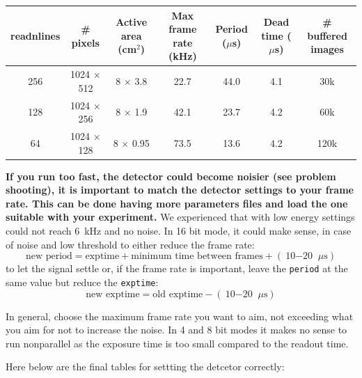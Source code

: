 \documentclass{article}
\begin{document}
{{{\begin{tabular}{|c|c|c|c|c|c|c|}
\hline
 readnlines & \# pixels & Active area (cm$^2$) & Max frame rate (kHz) & Period ($\mu$s) & Dead time ($\mu$s) & \# buffered images\\
\hline
256 &1024 $\times$ 512 & 8 $\times$ 3.8 & 22.7 & 44.0 &4.1 & 30k\\
\hline
128 &1024 $\times$ 256 & 8 $\times$ 1.9 & 42.1 & 23.7 &4.2 & 60k\\
\hline
64 & 1024 $\times$ 128 & 8 $\times$ 0.95 & 73.5 & 13.6 &4.2 & 120k\\
\hline
\end{tabular}
\label{table:hfrpartial}


\textbf{If you run too fast, the detector could become noisier (see problem shooting), it is important to match the detector settings to your frame rate. This can be done having more parameters files and load the one suitable with your experiment.} We experienced that with low energy settings could not reach 6~kHz and no noise.
In 16 bit mode, it could make sense, in case of noise and low threshold to either reduce the frame rate:
\begin{equation} 
\textrm{new period}  = \textrm{exptime} + \textrm{minimum time between frames} + (\textrm{10$-$20 }\mu \textrm{s})
\end{equation}
to let the signal settle  or,  if the frame rate is important, leave the {\tt{period}} at the same value but reduce the {\tt{exptime}}:
\begin{equation} 
\textrm{new exptime}  = \textrm{old exptime} - (\textrm{10$-$20 }\mu \textrm{s})
\end{equation}

In general, choose the maximum frame rate you want to aim, not exceeding what you aim for not to increase the noise. In 4 and 8 bit modes it makes no sense to run nonparallel as the exposure time is too small compared to the readout time. 

Here below are the final tables for settting the detcetor correctly:

}}}
\end{document}
